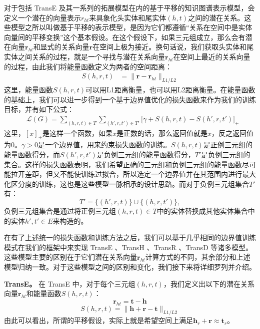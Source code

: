 对于包括 TransE 及其一系列的拓展模型在内的基于平移的知识图谱表示模型，会定义一个潜在的向量表示$r_{ht}$来具象化头实体和尾实体$(h, t)$之间的潜在关系。这些模型之所以叫做基于平移的表示模型，是因为它们都遵循``关系在空间中是实体向量间的平移变换''这个基本假设。在这个假设下，如果三元组成立，那么会有潜在向量$\textbf{r}_{ht}$和显式的关系向量$\textbf{r}$在空间上极为接近。换句话说，我们获取头实体和尾实体之间关系的过程，就是一个寻找与潜在关系向量$\textbf{r}_{ht}$在空间上最近的关系向量的过程，由此我们将能量函数定义为两者的空间距离：
\begin{align}
\label{eq2:energy functions}
S(h, r, t) & = \lVert \textbf{r} -  \textbf{r}_{ht} \rVert_{L1/L2}
\end{align}
这里，能量函数$S(h, r, t)$可以用L1距离衡量，也可以用L2距离衡量。在能量函数的基础上，我们可以进一步得到一个基于边界值优化的损失函数来作为我们的训练目标，并有如下公式：
\begin{align}
\label{eq2:loss}
& \mathcal{L}(G) = \sum_{(h,r,t) \in T} \sum_{(h',r,t')\in T'} \big[ \gamma + S(h,r,t) - S(h', r, t') \big]_{+}
\end{align}
这里，$[x]_{+}$是这样一个函数，如果$x$是正数的话，那么返回值就是$x$，反之返回值为$0$。$\gamma > 0$是一个边界值，用来约束损失函数的训练。$S(h, r, t)$是正例三元组的能量函数得分，而$S(h', r, t')$是负例三元组的能量函数得分，$T'$是负例三元组的集合。这样的损失函数表明，我们希望正确的三元组和负例三元组的能量函数尽可能拉开差距，但又不能使训练过拟合，所以选定一个边界值并在其范围内进行最大化区分度的训练，这也是这些模型一脉相承的设计思路。而对于负例三元组集合$T'$有：
\begin{equation}
T' = \{(h',r,t)\}  \cup \{(h,r,t')\},
\end{equation}
负例三元组集合是通过将正例三元组$(h, r, t) \in T$中的实体替换成其他实体集合中的实体$h', t' \in E$来构造的。

在有了上述统一的损失函数和训练方法之后，我们可以基于几乎相同的边界值训练模式在我们的框架中来实现 TransE \cite{bordes2013translating}、TransH \cite{wang2014transh}、TransR \cite{lin2015learning}、TransD \cite{ji2015knowledge} 等诸多模型。这些模型主要的区别在于它们潜在关系向量$\textbf{r}_{ht}$计算方式的不同，其余部分和上述模型归纳一致。对于这些模型之间的区别和变化，我们接下来将详细罗列并介绍。

\textbf{TransE。} 在 TransE 中，对于每个三元组$(h, r, t)$，我们定义出以下的潜在关系向量$\textbf{r}_{ht}$和能量函数$S(h,r,t)$：
\begin{equation}
\textbf{r}_{ht} = \textbf{t} - \textbf{h}
\end{equation}
\begin{equation}
S(h, r, t) = \lVert \textbf{h} + \textbf{r} - \textbf{t} \rVert_{L1/L2}
\end{equation}
由此可以看出，所谓的平移假设，实际上就是希望空间上满足$\mathbf{h}_r + \mathbf{r} \approx \mathbf{t}_r$。

